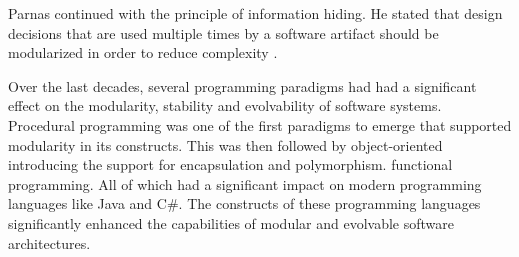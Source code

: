 Parnas continued with the principle of information hiding. He stated that design decisions
that are used multiple times by a software artifact should be modularized in order to
reduce complexity \parencite{parnas_criteria_1972}. 

Over the last decades, several programming paradigms had had a significant effect on the
modularity, stability and evolvability of software systems. Procedural programming was one
of the first paradigms to emerge that supported modularity in its constructs. This was
then followed by object-oriented introducing the support for encapsulation and
polymorphism. functional programming. All of which had a significant impact on modern
programming languages like Java and C\#. The constructs of these programming languages
significantly enhanced the capabilities of modular and evolvable software architectures. 







